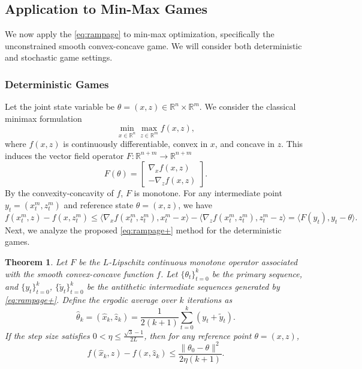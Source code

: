 \documentclass[letter,11pt]{article}
\newtheorem{theorem}{Theorem}[]
\begin{document}
\subsection{Application to Min-Max Games}\label{sec:games}
We now apply the \eqref{eq:rampage} to min-max optimization, specifically the unconstrained smooth convex-concave game. We will consider both deterministic and stochastic game settings.
\subsubsection{Deterministic Games}
Let the joint state variable be $\theta = (x, z) \in \mathbb{R}^n \times \mathbb{R}^m$. We consider the classical minimax formulation
\begin{equation} \label{eq:min-max_problem}
\min_{x \in \mathbb{R}^n} \max_{z \in \mathbb{R}^m} f(x, z),
\end{equation}
where $f(x, z)$ is continuously differentiable, convex in $x$, and concave in $z$. This induces the vector field operator $F: \mathbb{R}^{n+m} \to \mathbb{R}^{n+m}$
\begin{equation} \label{eq:operator_def}
F(\theta) = \begin{bmatrix} \nabla_x f(x, z) \\ -\nabla_z f(x, z) \end{bmatrix}.
\end{equation}
By the convexity-concavity of $f$, $F$ is monotone. For any intermediate point $y_t = (x_t^m, z_t^m)$ and reference state $\theta = (x, z)$, we have
\begin{equation} \label{eq:convex_concave_bound}
f(x_t^m, z) - f(x, z_t^m) \le \langle \nabla_x f(x_t^m, z_t^m), x_t^m - x \rangle - \langle \nabla_z f(x_t^m, z_t^m), z_t^m - z \rangle = \langle F(y_t), y_t - \theta \rangle.
\end{equation}
Next, we analyze the proposed \eqref{eq:rampage+} method for the deterministic games.
\begin{theorem} \label{thm:ergodic_esramp}
Let $F$ be the $L$-Lipschitz continuous monotone operator associated with the smooth convex-concave function $f$. Let $\{\theta_t\}_{t=0}^k$ be the primary sequence, and $\{y_t\}_{t=0}^k$, $\{\tilde{y}_t\}_{t=0}^k$ be the antithetic intermediate sequences generated by \eqref{eq:rampage+}. Define the ergodic average over $k$ iterations as
\begin{equation} \label{eq:ramp_ergodic_def}
\hat{\theta}_k = (\hat{x}_k, \hat{z}_k) = \frac{1}{2(k+1)} \sum_{t=0}^k (y_t + \tilde{y}_t).
\end{equation}
If the step size satisfies $0 < \eta \le \frac{\sqrt{3}-1}{2L}$, then for any reference point $\theta = (x, z)$,
\begin{equation} \label{eq:ramp_ergodic_rate}
f(\hat{x}_k, z) - f(x, \hat{z}_k) \le \frac{\|\theta_0 - \theta\|^2}{2\eta (k+1)}.
\end{equation}
\end{theorem}
\end{document}

